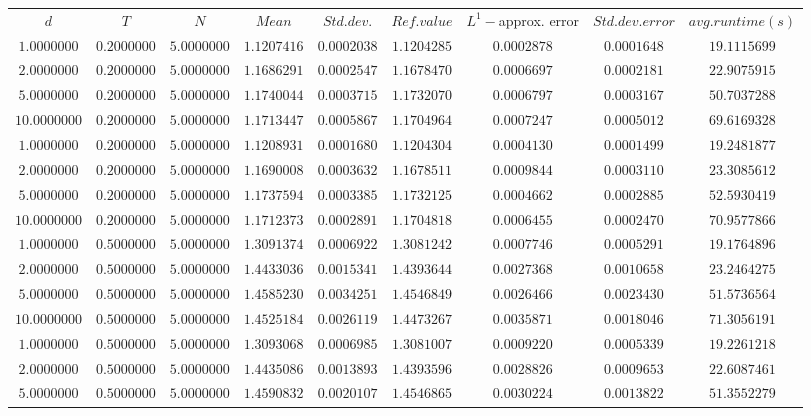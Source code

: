 \begin{tabular}{ccccccccc}
$d$ & $T$ & $N$ & $Mean$ & $Std. dev.$ & $Ref. value$ & $L^1-$approx. error & $Std. dev. error$ & $avg. runtime (s)$\\
$1.0000000$ & $0.2000000$ & $5.0000000$ & $1.1207416$ & $0.0002038$ & $1.1204285$ & $0.0002878$ & $0.0001648$ & $19.1115699$\\
$2.0000000$ & $0.2000000$ & $5.0000000$ & $1.1686291$ & $0.0002547$ & $1.1678470$ & $0.0006697$ & $0.0002181$ & $22.9075915$\\
$5.0000000$ & $0.2000000$ & $5.0000000$ & $1.1740044$ & $0.0003715$ & $1.1732070$ & $0.0006797$ & $0.0003167$ & $50.7037288$\\
$10.0000000$ & $0.2000000$ & $5.0000000$ & $1.1713447$ & $0.0005867$ & $1.1704964$ & $0.0007247$ & $0.0005012$ & $69.6169328$\\
$1.0000000$ & $0.2000000$ & $5.0000000$ & $1.1208931$ & $0.0001680$ & $1.1204304$ & $0.0004130$ & $0.0001499$ & $19.2481877$\\
$2.0000000$ & $0.2000000$ & $5.0000000$ & $1.1690008$ & $0.0003632$ & $1.1678511$ & $0.0009844$ & $0.0003110$ & $23.3085612$\\
$5.0000000$ & $0.2000000$ & $5.0000000$ & $1.1737594$ & $0.0003385$ & $1.1732125$ & $0.0004662$ & $0.0002885$ & $52.5930419$\\
$10.0000000$ & $0.2000000$ & $5.0000000$ & $1.1712373$ & $0.0002891$ & $1.1704818$ & $0.0006455$ & $0.0002470$ & $70.9577866$\\
$1.0000000$ & $0.5000000$ & $5.0000000$ & $1.3091374$ & $0.0006922$ & $1.3081242$ & $0.0007746$ & $0.0005291$ & $19.1764896$\\
$2.0000000$ & $0.5000000$ & $5.0000000$ & $1.4433036$ & $0.0015341$ & $1.4393644$ & $0.0027368$ & $0.0010658$ & $23.2464275$\\
$5.0000000$ & $0.5000000$ & $5.0000000$ & $1.4585230$ & $0.0034251$ & $1.4546849$ & $0.0026466$ & $0.0023430$ & $51.5736564$\\
$10.0000000$ & $0.5000000$ & $5.0000000$ & $1.4525184$ & $0.0026119$ & $1.4473267$ & $0.0035871$ & $0.0018046$ & $71.3056191$\\
$1.0000000$ & $0.5000000$ & $5.0000000$ & $1.3093068$ & $0.0006985$ & $1.3081007$ & $0.0009220$ & $0.0005339$ & $19.2261218$\\
$2.0000000$ & $0.5000000$ & $5.0000000$ & $1.4435086$ & $0.0013893$ & $1.4393596$ & $0.0028826$ & $0.0009653$ & $22.6087461$\\
$5.0000000$ & $0.5000000$ & $5.0000000$ & $1.4590832$ & $0.0020107$ & $1.4546865$ & $0.0030224$ & $0.0013822$ & $51.3552279$\\

\end{tabular}
